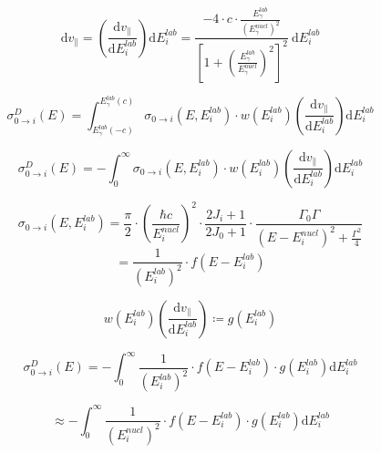 \documentclass{article}
\begin{document}
\begin{equation}
\label{substitute_v_E}
\mathrm{d} v_\parallel = \left( \frac{\mathrm{d} v_\parallel}{\mathrm{d} E_i^{lab}} \right) \mathrm{d} E_i^{lab} = \frac{- 4 \cdot c \cdot \frac{E_\gamma^{lab}}{\left( E_\gamma^{nucl} \right)^2}}{ \left[ 1 + \left( \frac{E_\gamma^{lab}}{E_\gamma^{nucl}} \right)^2 \right]^2} ~ \mathrm{d} E_i^{lab}
\end{equation}

\begin{equation}
\label{pseudo_convolution_E_0}
\sigma^{D}_{0 \to i} (E) = \int_{E_\gamma^{lab} \left(-c \right)}^{E_\gamma^{lab} \left(c \right)} \sigma_{0 \to i} (E, E_i^{lab}) \cdot w(E_i^{lab}) \left( \frac{\mathrm{d} v_\parallel}{\mathrm{d} E_i^{lab}} \right) \mathrm{d} E_i^{lab}
\end{equation}

\begin{equation}
\label{pseudo_convolution_E}
\sigma^{D}_{0 \to i} (E) = - \int_{0}^{\infty} \sigma_{0 \to i} (E, E_i^{lab}) \cdot w(E_i^{lab}) \left( \frac{\mathrm{d} v_\parallel}{\mathrm{d} E_i^{lab}} \right) \mathrm{d} E_i^{lab}
\end{equation}

\begin{equation}
\label{convolution_f_1}
\sigma_{0 \to i} (E, E_i^{lab}) = \frac{\pi}{2} \cdot \left( \frac{\hbar c}{E_i^{nucl}} \right)^2 \cdot \frac{2 J_i + 1}{2 J_0 + 1} \cdot \frac{\Gamma_0 \Gamma}{\left( E - E_i^{nucl} \right)^2 + \frac{\Gamma^2}{4}} 
\end{equation}
\begin{equation}
= \frac{1}{\left( E_i^{lab} \right)^2} \cdot f\left( E - E^{lab}_i \right)
\end{equation}

\begin{equation}
\label{convolution_g}
	w \left( E^{lab}_i \right)\left( \frac{\mathrm{d} v_\parallel}{\mathrm{d} E_i^{lab}} \right) \coloneqq g \left( E^{lab}_i \right)
\end{equation}

\begin{equation}
\label{convolution_approximation_1}
\sigma^{D}_{0 \to i} (E) = - \int_{0}^{\infty} \frac{1}{\left( E_i^{lab} \right)^2} \cdot f\left( E - E^{lab}_i \right) \cdot g \left( E^{lab}_i \right) \mathrm{d} E_i^{lab}
\end{equation}

\begin{equation}
\label{convolution_approximation_2}
\approx - \int_{0}^{\infty} \frac{1}{\left( E_i^{nucl} \right)^2} \cdot f\left( E - E^{lab}_i \right) \cdot g \left( E^{lab}_i \right) \mathrm{d} E_i^{lab}
\end{equation}
\end{document}
